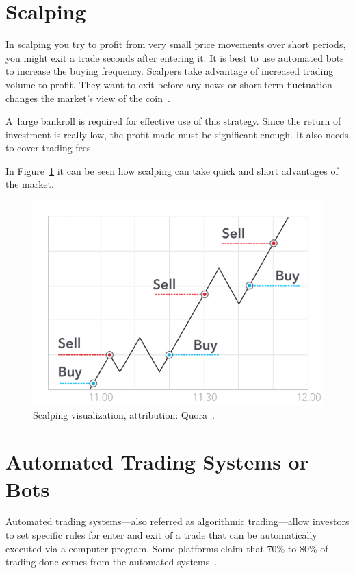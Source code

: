 \section{Scalping}
\label{section-scalping}
In scalping you try to profit from very small price movements over short periods, you might exit a trade seconds after entering it. It is best to use automated bots to increase the buying frequency. Scalpers take advantage of increased trading volume to profit. They want to exit before any news or short-term fluctuation changes the market's view of the coin~\cite{best-crypto-daytrading}.

A~large bankroll is required for effective use of this strategy. Since the return of investment is really low, the profit made must be significant enough. It also needs to cover trading fees.

In Figure~\ref{scalping-figure} it can be seen how scalping can take quick and short advantages of the market.

\begin{figure}[!t]
    \centering
    \includegraphics[width=\columnwidth]{figures/scalping.png}
    \caption{Scalping visualization, attribution: Quora~\cite{best-crypto-daytrading}.}
    \label{scalping-figure}
\end{figure}

\section{Automated Trading Systems or Bots}
\label{bots}
Automated trading systems---also referred as algorithmic trading---allow investors to set specific rules for enter and exit of a trade that can be automatically executed via a computer program. Some platforms claim that 70\% to 80\% of trading done comes from the automated systems~\cite{investopedia-bot-trading}.

